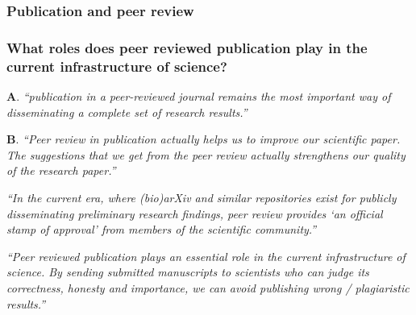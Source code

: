 \documentclass[12pt]{beamer}
\newcommand\ans[1]{{\it ``#1''}}
\newcommand\gap{\vspace{5mm}}
\begin{document}

\begin{frame}

\frametitle{
Publication and peer review
}

\end{frame}

\begin{frame} %

\frametitle{  What roles does peer reviewed publication play in the current infrastructure of science? }

{\bf A}. \ans{publication in a peer-reviewed journal remains the most important way of disseminating a complete set of research results.}

\gap

{\bf B}. \ans{Peer  review  in  publication  actually  helps  us  to  improve  our  scientific  paper.   The suggestions that we get from the peer review actually strengthens our quality of the research paper.}

\end{frame}
\begin{frame}

\ans{In the current era, where (bio)arXiv and similar repositories exist for publicly disseminating preliminary research findings, peer review provides `an official stamp of approval' from members of the scientific community.}

\gap

\ans{Peer reviewed publication plays an essential role in the current infrastructure of science. By sending submitted manuscripts to scientists who can judge its correctness, honesty and importance, we can avoid publishing wrong / plagiaristic results.}

\end{frame}
\end{document}
